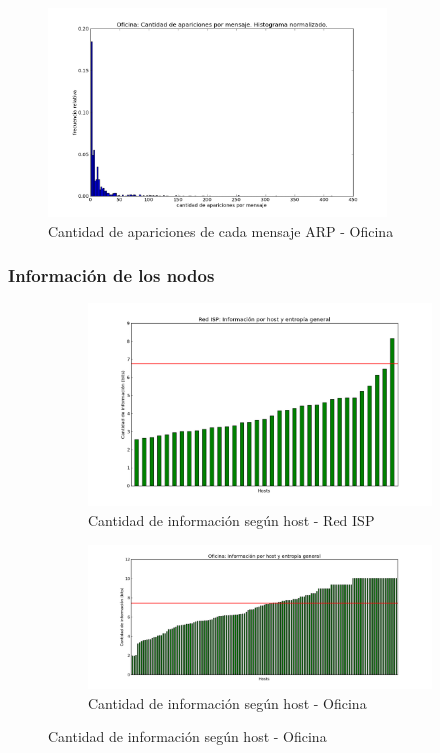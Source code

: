 \begin{figure}[H]
	\centering
	\includegraphics[width=0.8\textwidth]{graficos/hist_oficina.png}
	\caption{Cantidad de apariciones de cada mensaje ARP - Oficina}
	\label{fig:hist6}
\end{figure}

\subsubsection{Informaci\'on de los nodos}

\begin{figure}[H]
        \begin{subfigure}[H]{0.5\textwidth}
                \centering
                \includegraphics[width=1\textwidth]{graficos/infoHost_casa.png}
                \caption{Cantidad de informaci\'on seg\'un host - Red ISP}
                \label{fig:info1}
        \end{subfigure}
        \begin{subfigure}[H]{0.5\textwidth}
                \centering
                \includegraphics[width=1\textwidth]{graficos/infoHost_oficina.png}
                \caption{Cantidad de informaci\'on seg\'un host - Oficina}
                \label{fig:info2}
        \end{subfigure}
\end{figure}

